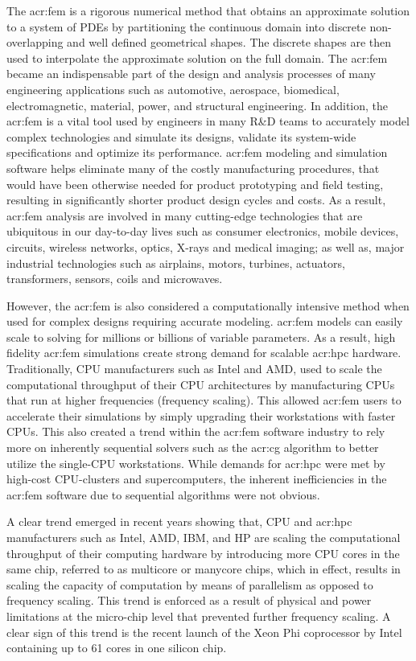 The \gls{acr:fem} is a rigorous numerical method that obtains an approximate solution to a system of PDEs by partitioning the continuous domain into discrete non-overlapping and well defined geometrical shapes.
The discrete shapes are then used to interpolate the approximate solution on the full domain.
The \gls{acr:fem} became an indispensable part of the design and analysis processes of many engineering applications such as automotive, aerospace, biomedical, electromagnetic, material, power, and structural engineering.  
In addition, the \gls{acr:fem} is a vital tool used by engineers  in many R\&D teams to accurately model complex technologies and simulate its designs, validate its system-wide specifications and optimize its performance.  
\gls{acr:fem} modeling and simulation software helps eliminate many of the costly manufacturing procedures, that would have been otherwise needed for product prototyping and field testing, resulting in significantly shorter product design cycles and costs.
As a result, \gls{acr:fem} analysis are involved in many cutting-edge technologies that are ubiquitous in our day-to-day lives such as consumer electronics, mobile devices, circuits, wireless networks, optics, X-rays and medical imaging; as well as, major industrial technologies such as airplains, motors, turbines, actuators, transformers, sensors, coils and microwaves.


However, the \gls{acr:fem} is also considered a computationally intensive method when used for complex designs requiring accurate modeling.
\gls{acr:fem} models can easily scale to solving for millions or billions of variable parameters.
As a result, high fidelity \gls{acr:fem} simulations create strong demand for scalable \gls{acr:hpc} hardware.
Traditionally, CPU manufacturers such as Intel\rtm{} and AMD\rtm{}, used to scale the computational throughput of their CPU architectures by manufacturing CPUs that run at higher frequencies (frequency scaling).
This allowed \gls{acr:fem} users to accelerate their simulations by simply upgrading their workstations with faster CPUs.
This also created a trend within the \gls{acr:fem} software industry to rely more on inherently sequential solvers such as the \gls{acr:cg} algorithm to better utilize the single-CPU workstations.
While demands for \gls{acr:hpc} were met by high-cost CPU-clusters and supercomputers, the inherent inefficiencies in the \gls{acr:fem} software due to sequential algorithms were not obvious.


A clear trend emerged in recent years showing that, CPU and \gls{acr:hpc} manufacturers such as Intel\rtm{}, AMD\rtm{}, IBM\rtm{}, and HP\rtm{} are scaling the computational throughput of their computing hardware by introducing more CPU cores in the same chip, referred to as  multicore or manycore chips, which in effect, results in scaling the capacity of computation by means of parallelism as opposed to frequency scaling.
This trend is enforced as a result of physical and power limitations at the micro-chip level that prevented further frequency scaling.
A clear sign of this trend is the recent launch of the Xeon Phi\tm{} \cite{bib:Phi} coprocessor by Intel\rtm{} containing up to 61 cores in one silicon chip.


